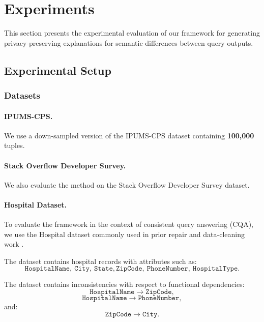 

\section{Experiments}
\label{sec:experiments}

This section presents the experimental evaluation of our framework for generating
privacy-preserving explanations for semantic differences between query outputs.

\subsection{Experimental Setup}

\subsubsection{Datasets}

\paragraph{IPUMS-CPS.}
We use a down-sampled version of the IPUMS-CPS dataset containing
\textbf{100,000} tuples.

\paragraph{Stack Overflow Developer Survey.}
We also evaluate the method on the Stack Overflow Developer Survey dataset.

\paragraph{Hospital Dataset.}
To evaluate the framework in the context of consistent query answering (CQA),
we use the Hospital dataset commonly used in prior repair and data-cleaning
work \cite{rekatsinas2017}.

The dataset contains hospital records with attributes such as:
\[
\texttt{HospitalName},\ \texttt{City},\ \texttt{State},
\texttt{ZipCode},\ \texttt{PhoneNumber},\ \texttt{HospitalType}.
\]

The dataset contains inconsistencies with respect to functional dependencies:
\[
\texttt{HospitalName} \rightarrow \texttt{ZipCode},
\]
\[
\texttt{HospitalName} \rightarrow \texttt{PhoneNumber},
\]
and:
\[
\texttt{ZipCode} \rightarrow \texttt{City}.
\]

